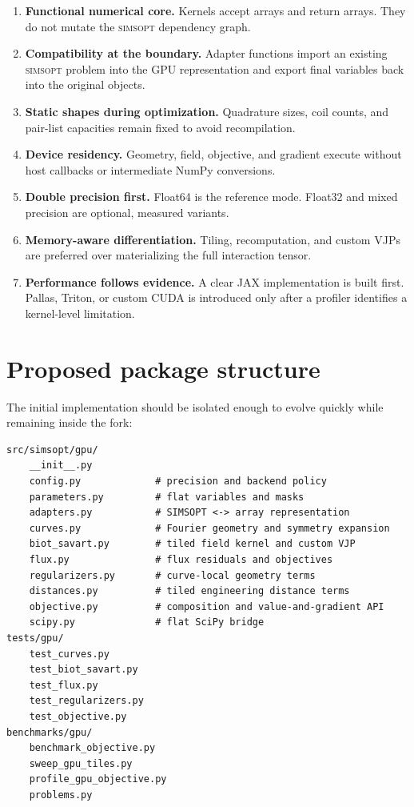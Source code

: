 \documentclass[11pt,a4paper]{article}
\newcommand{\simsopt}{\textsc{simsopt}}
\begin{document}
\begin{enumerate}
  \item \textbf{Functional numerical core.}  Kernels accept arrays and return
        arrays.  They do not mutate the \simsopt{} dependency graph.
  \item \textbf{Compatibility at the boundary.}  Adapter functions import an
        existing \simsopt{} problem into the GPU representation and export final
        variables back into the original objects.
  \item \textbf{Static shapes during optimization.}  Quadrature sizes, coil
        counts, and pair-list capacities remain fixed to avoid recompilation.
  \item \textbf{Device residency.}  Geometry, field, objective, and gradient
        execute without host callbacks or intermediate NumPy conversions.
  \item \textbf{Double precision first.}  Float64 is the reference mode.
        Float32 and mixed precision are optional, measured variants.
  \item \textbf{Memory-aware differentiation.}  Tiling, recomputation, and
        custom VJPs are preferred over materializing the full interaction
        tensor.
  \item \textbf{Performance follows evidence.}  A clear JAX implementation is
        built first.  Pallas, Triton, or custom CUDA is introduced only after a
        profiler identifies a kernel-level limitation.
\end{enumerate}

\section{Proposed package structure}

The initial implementation should be isolated enough to evolve quickly while
remaining inside the fork:
\begin{verbatim}
src/simsopt/gpu/
    __init__.py
    config.py             # precision and backend policy
    parameters.py         # flat variables and masks
    adapters.py           # SIMSOPT <-> array representation
    curves.py             # Fourier geometry and symmetry expansion
    biot_savart.py        # tiled field kernel and custom VJP
    flux.py               # flux residuals and objectives
    regularizers.py       # curve-local geometry terms
    distances.py          # tiled engineering distance terms
    objective.py          # composition and value-and-gradient API
    scipy.py              # flat SciPy bridge
tests/gpu/
    test_curves.py
    test_biot_savart.py
    test_flux.py
    test_regularizers.py
    test_objective.py
benchmarks/gpu/
    benchmark_objective.py
    sweep_gpu_tiles.py
    profile_gpu_objective.py
    problems.py
\end{verbatim}
\end{document}
